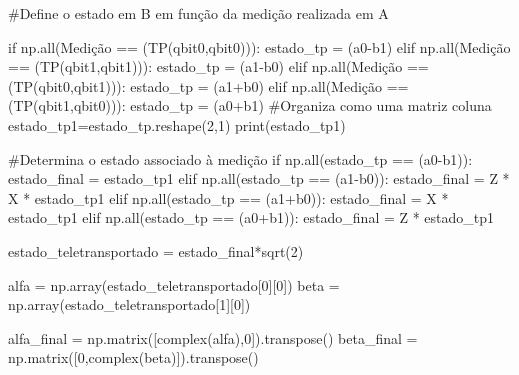 \begin{pycode}
    #Define o estado em B em função da medição realizada em A

		if  np.all(Medição == (TP(qbit0,qbit0))):
   			 estado_tp = (a0-b1)
		elif  np.all(Medição == (TP(qbit1,qbit1))):
    			estado_tp = (a1-b0)
		elif  np.all(Medição == (TP(qbit0,qbit1))):
    			estado_tp = (a1+b0)
		elif np.all(Medição == (TP(qbit1,qbit0))):
   			 estado_tp = (a0+b1)
	#Organiza como uma matriz coluna    
		estado_tp1=estado_tp.reshape(2,1)   
		print(estado_tp1)
		
	#Determina o estado associado à medição	
		if np.all(estado_tp == (a0-b1)):
   		 estado_final = estado_tp1
		elif np.all(estado_tp == (a1-b0)):
   		 estado_final = Z * X * estado_tp1 
		elif np.all(estado_tp == (a1+b0)):
   		 estado_final = X * estado_tp1 
		elif np.all(estado_tp == (a0+b1)):
    		estado_final = Z * estado_tp1 
    
		estado_teletransportado = estado_final*sqrt(2)    

		alfa = np.array(estado_teletransportado[0][0])
		beta = np.array(estado_teletransportado[1][0])

		alfa_final = np.matrix([complex(alfa),0]).transpose()
		beta_final = np.matrix([0,complex(beta)]).transpose()
\end{pycode}

